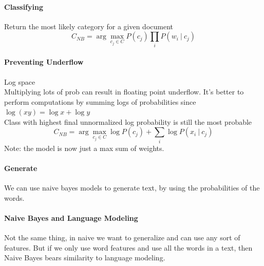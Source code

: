 \documentclass[10pt]{report}
\begin{document}
\paragraph{Classifying} Return the most likely category for a given document$$C_{NB} = \arg\max_{c_j\in C} P(c_j)\prod_i P(w_i\:|\:c_j)$$
\paragraph{Preventing Underflow} Log space\\
Multiplying lots of prob can result in floating point underflow. It's better to perform computations by summing logs of probabilities since $\log(xy) = \log x+\log y$\\
Class with highest final unnormalized log probability is still the most probable 
$$C_{NB} = \arg\max_{c_j\in C}\log P(c_j) + \sum_i \log P(x_i\:|\:c_j)$$
Note: the model is now just a max sum of weights.
\paragraph{Generate} We can use naive bayes models to generate text, by using the probabilities of the words.
\paragraph{Naive Bayes and Language Modeling} Not the same thing, in naive we want to generalize and can use any sort of features. But if we only use word features and use all the words in a text, then Naive Bayes bears similarity to language modeling.
\end{document}
